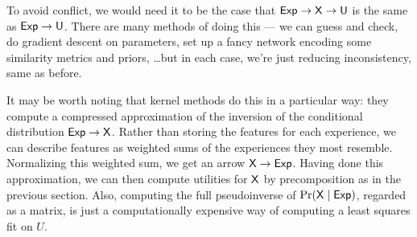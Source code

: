 \documentclass{article}
\begin{document}
	\begin{center}
	\end{center}
		
	To avoid conflict, we would need it to be the case that $\sf Exp \to X \to U$ is the same as $\sf Exp \to U$. There are many methods of doing this --- we can  guess and check, do gradient descent on parameters, set up a fancy network encoding some similarity metrics and priors, \ldots but in each case, we're just reducing inconsistency, same as before. 
	
	It may be worth noting that kernel methods do this in a particular way: they compute a compressed approximation of the inversion of the conditional distribution $\sf Exp \to X$. Rather than storing the features for each experience, we can describe features as weighted sums of the experiences they most resemble. Normalizing this weighted sum, we get an arrow  $\sf X \to Exp$. Having done this approximation, we can then compute utilities for $\sf X$ by precomposition as in the previous section. Also, computing the full pseudoinverse of $\Pr(\sf X \mid Exp)$, regarded as a matrix, is just a computationally expensive way of computing a least squares fit on $U$.
	
\end{document}
